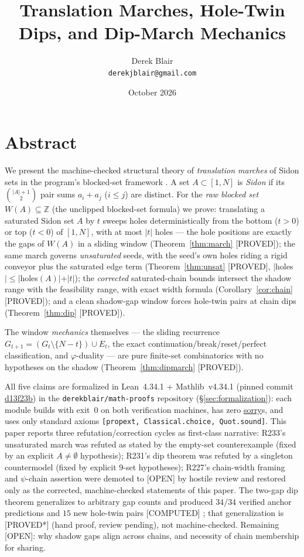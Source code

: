 \documentclass[11pt,a4paper]{article}
\title{Translation Marches, Hole-Twin Dips, and Dip-March Mechanics}
\author{Derek Blair \\ \texttt{derekjblair@gmail.com}}
\date{October 2026}
\theoremstyle{definition}
\begin{document}
\maketitle

\section{Abstract}

We present the machine-checked structural theory of \emph{translation
marches} of Sidon sets in the program's blocked-set framework
\cite{D227}. A set $A\subset[1,N]$ is \emph{Sidon} if its
$\binom{|A|+1}{2}$ pair sums $a_i+a_j$ ($i\le j$) are distinct. For the
\emph{raw blocked set} $W(A)\subseteq\mathbb{Z}$ (the unclipped
blocked-set formula) we prove: translating a saturated Sidon set $A$
by $t$ sweeps holes deterministically from the bottom ($t>0$) or top
($t<0$) of $[1,N]$, with at most $|t|$ holes --- the hole positions
are exactly the gaps of $W(A)$ in a sliding window
(Theorem~\ref{thm:march} [PROVED]); the same march governs
\emph{unsaturated} seeds, with the seed's own holes riding a rigid
conveyor plus the saturated edge term
(Theorem~\ref{thm:unsat} [PROVED], $|$holes$|\le|$holes$(A)|+|t|$);
the \emph{corrected} saturated-chain bounds intersect the shadow range
with the feasibility range, with exact width formula
(Corollary~\ref{cor:chain} [PROVED]); and a clean shadow-gap window
forces hole-twin pairs at chain dips
(Theorem~\ref{thm:dip} [PROVED]).

The window \emph{mechanics} themselves --- the sliding recurrence
$G_{t+1}=(G_t\setminus\{N-t\})\cup E_t$, the exact
continuation/break/reset/perfect classification, and $\varphi$-duality
--- are pure finite-set combinatorics with no hypotheses on the shadow
(Theorem~\ref{thm:dipmarch} [PROVED]).

All five claims are formalized in Lean~4.34.1 + Mathlib~v4.34.1
(pinned commit \url{d13f23b}) in the \texttt{derekblair/math-proofs}
repository (\S\ref{sec:formalization}): each module builds with exit~0
on both verification machines, has zero \url{sorry}s, and uses
only standard axioms \texttt{[propext, Classical.choice,
Quot.sound]}. This paper reports three refutation/correction cycles
as first-class narrative: R233's unsaturated march was refuted as
stated by the empty-set counterexample (fixed by an explicit
$A\ne\emptyset$ hypothesis); R231's dip theorem was refuted by a
singleton countermodel (fixed by explicit $9$-set hypotheses); R227's
chain-width framing and $\psi$-chain assertion were demoted to
[OPEN] by hostile review and restored only as the corrected,
machine-checked statements of this paper. The two-gap dip theorem
generalizes to arbitrary gap counts and produced $34/34$ verified
anchor predictions and $15$ new hole-twin pairs [COMPUTED]
\cite{D243}; that generalization is [PROVED*] (hand proof, review
pending), not machine-checked. Remaining [OPEN]: why shadow gaps
align across chains, and necessity of chain membership for sharing.
\end{document}
